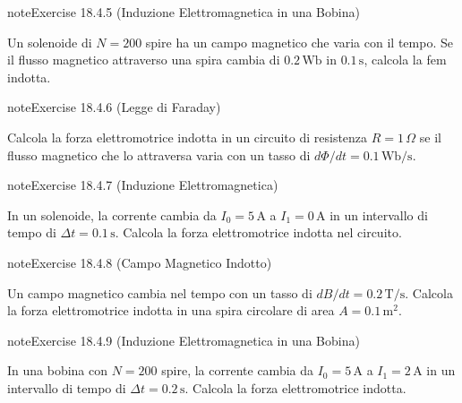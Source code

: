\documentclass[letterpaper,10pt,italian]{jupyterBook}
\begin{document}
\begin{sphinxadmonition}{note}{Exercise 18.4.5 (Induzione Elettromagnetica in una Bobina)}



\sphinxAtStartPar
Un solenoide di \(N = 200\) spire ha un campo magnetico che varia con il tempo. Se il flusso magnetico attraverso una spira cambia di \(0.2 \, \text{Wb}\) in \(0.1 \, \text{s}\), calcola la fem indotta.
\end{sphinxadmonition}
 \label{exercise:ch/electromagnetism/electromagnetism-general-problems-exercise-5}

\begin{sphinxadmonition}{note}{Exercise 18.4.6 (Legge di Faraday)}



\sphinxAtStartPar
Calcola la forza elettromotrice indotta in un circuito di resistenza \(R = 1 \, \Omega\) se il flusso magnetico che lo attraversa varia con un tasso di \(d\Phi/dt = 0.1 \, \text{Wb/s}\).
\end{sphinxadmonition}
 \label{exercise:ch/electromagnetism/electromagnetism-general-problems-exercise-6}

\begin{sphinxadmonition}{note}{Exercise 18.4.7 (Induzione Elettromagnetica)}



\sphinxAtStartPar
In un solenoide, la corrente cambia da \(I_0 = 5 \, \text{A}\) a \(I_1 = 0 \, \text{A}\) in un intervallo di tempo di \(\Delta t = 0.1 \, \text{s}\). Calcola la forza elettromotrice indotta nel circuito.
\end{sphinxadmonition}
 \label{exercise:ch/electromagnetism/electromagnetism-general-problems-exercise-7}

\begin{sphinxadmonition}{note}{Exercise 18.4.8 (Campo Magnetico Indotto)}



\sphinxAtStartPar
Un campo magnetico cambia nel tempo con un tasso di \(dB/dt = 0.2 \, \text{T/s}\). Calcola la forza elettromotrice indotta in una spira circolare di area \(A = 0.1 \, \text{m}^2\).
\end{sphinxadmonition}
 \label{exercise:ch/electromagnetism/electromagnetism-general-problems-exercise-8}

\begin{sphinxadmonition}{note}{Exercise 18.4.9 (Induzione Elettromagnetica in una Bobina)}



\sphinxAtStartPar
In una bobina con \(N = 200\) spire, la corrente cambia da \(I_0 = 5 \, \text{A}\) a \(I_1 = 2 \, \text{A}\) in un intervallo di tempo di \(\Delta t = 0.2 \, \text{s}\). Calcola la forza elettromotrice indotta.
\end{sphinxadmonition}
 \label{exercise:ch/electromagnetism/electromagnetism-general-problems-exercise-9}
\end{document}
